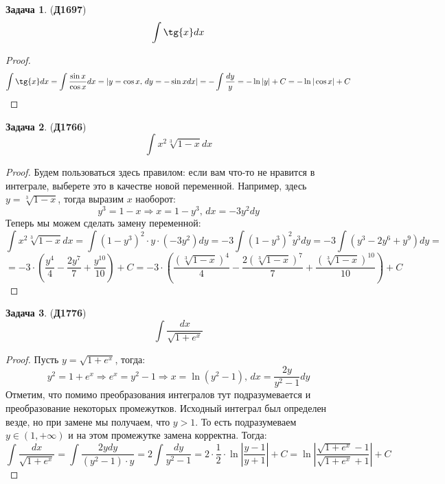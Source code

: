 \documentclass[12pt]{article}
\theoremstyle{definition}
\newtheorem{problem}{Задача}
\DeclareMathOperator{\dint}{\displaystyle\int}
\begin{document}
\begin{problem}(\textbf{Д1697})
	$$
		\dint \tg{x} dx
	$$
\end{problem}
\begin{proof}
	$$
		\dint \tg{x} dx = \dint \dfrac{\sin{x}}{\cos{x}}dx = |y = \cos{x}, \, dy = -\sin{x}dx| = -\dint\dfrac{dy}{y} = -\ln|y| + C = - \ln{|\cos{x}|} + C
	$$
\end{proof}
\begin{problem}(\textbf{Д1766})
	$$
		\dint x^2 \sqrt[3]{1 -x} dx
	$$
\end{problem}
\begin{proof}
	Будем пользоваться здесь правилом: если вам что-то не нравится в интеграле, выберете это в качестве новой переменной. Например, здесь $y = \sqrt[3]{1 - x}$, тогда выразим $x$ наоборот:
	$$
		y^3 =  1 - x \Rightarrow x = 1 - y^3, \, dx = -3 y^2 dy
	$$
	Теперь мы можем сделать замену переменной:
	$$
		\dint x^2 \sqrt[3]{1 -x} dx = \dint (1 - y^3)^2 {\cdot} y{\cdot} (-3y^2)dy = -3\dint (1 - y^3)^2 y^3 dy = -3 \dint (y^3 - 2y^6 + y^9)dy =
	$$
	$$
		=  -3{\cdot}\left(\dfrac{y^4}{4} - \dfrac{2y^7}{7} + \dfrac{y^{10}}{10}\right) + C = -3{\cdot}\left(\dfrac{(\sqrt[3]{1 - x})^4}{4} - \dfrac{2(\sqrt[3]{1 - x})^7}{7} + \dfrac{(\sqrt[3]{1 - x})^{10}}{10}\right) + C
	$$
\end{proof}

\begin{problem}(\textbf{Д1776})
	$$
		\dint \dfrac{dx}{\sqrt{1 + e^x}} 
	$$
\end{problem}
\begin{proof}
	Пусть $y = \sqrt{1 + e^x}$, тогда:
	$$
		y^2 = 1 + e^x \Rightarrow e^x = y^2 - 1 \Rightarrow x = \ln{(y^2 - 1)}, \, dx = \dfrac{2y}{y^2 - 1}dy
	$$
	Отметим, что помимо преобразования интегралов тут подразумевается и преобразование некоторых промежутков. Исходный интеграл был определен везде, но при замене мы получаем, что $y > 1$. То есть подразумеваем $y \in (1, + \infty)$ и на этом промежутке замена корректна. Тогда:
	$$
		\dint \dfrac{dx}{\sqrt{1 + e^x}}  = \dint \dfrac{2y dy}{( y^2 - 1){\cdot}y} = 2\dint \dfrac{dy}{y^2 - 1} = 2 {\cdot}\dfrac{1}{2}{\cdot}\ln{\left| \dfrac{y-1}{y+1}\right|} + C =
		\ln{\left| \dfrac{\sqrt{1 + e^x}-1}{\sqrt{1 + e^x}+1}\right|} + C 
	$$ 
\end{proof}
\newpage
\end{document}
